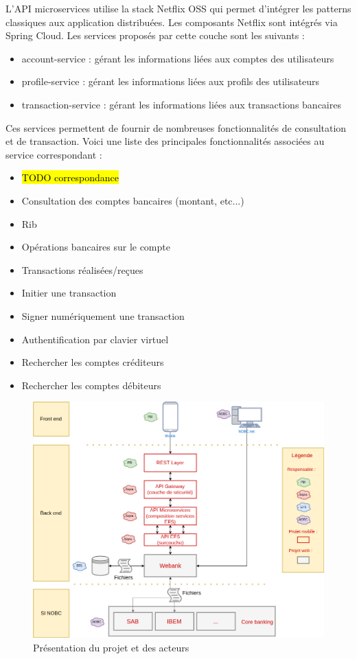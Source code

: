 	L'API microservices utilise la stack Netflix OSS qui permet d'intégrer les patterns classiques aux application distribuées. Les composants Netflix sont intégrés via Spring Cloud. Les services proposés par cette couche sont les suivants :\\

\begin{itemize}
			\item account-service : gérant les informations liées aux comptes des utilisateurs
			\item profile-service : gérant les informations liées aux profils des utilisateurs
			\item transaction-service : gérant les informations liées aux transactions bancaires \\
\end{itemize}

	Ces services permettent de fournir de nombreuses fonctionnalités de consultation et de transaction. Voici une liste des principales fonctionnalités associées au service correspondant :
	\begin{itemize}
		\item \hl{TODO correspondance}
		\item Consultation des comptes bancaires (montant, etc...)
		\item Rib
		\item Opérations bancaires sur le compte
		\item Transactions réalisées/reçues
		\item Initier une transaction
		\item Signer numériquement une transaction
		\item Authentification par clavier virtuel
		\item Rechercher les comptes créditeurs
		\item Rechercher les comptes débiteurs
	\end{itemize}

\begin{figure}[H]
\raggedleft
	\includegraphics[scale=0.45]{images/travailNeuflizeOBC/architecture/archiFonc.png}
	\centering
	\caption{Présentation du projet et des acteurs}
	\label{archiFonc}
\end{figure}

